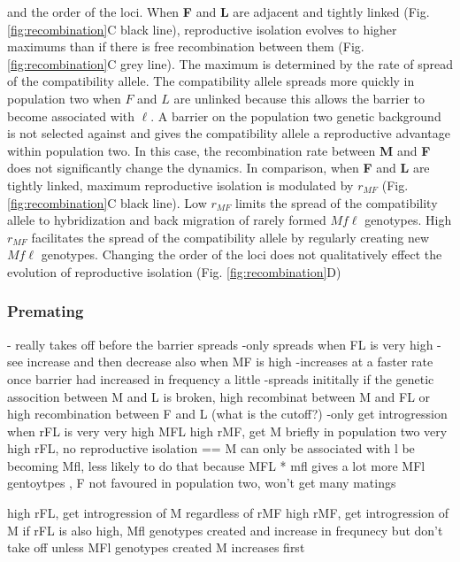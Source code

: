 \documentclass[11pt]{article}
\begin{document}
and the order of the loci. When \textbf{F} and \textbf{L} are adjacent and tightly linked (Fig. \ref{fig:recombination}C black line), reproductive isolation evolves to higher maximums than if there is free recombination between them (Fig. \ref{fig:recombination}C grey line). The maximum is determined by the rate of spread of the compatibility allele. The compatibility allele spreads more quickly in population two when $F$ and $L$ are unlinked because this allows the barrier to become associated with $\ell$. A barrier on the population two genetic background is not selected against and gives the compatibility allele a reproductive advantage within population two. In this case, the recombination rate between \textbf{M} and \textbf{F} does not significantly change the dynamics. In comparison, when \textbf{F} and \textbf{L} are tightly linked, maximum reproductive isolation is modulated by $r_{MF}$ (Fig. \ref{fig:recombination}C black line). Low $r_{MF}$ limits the spread of the compatibility allele to hybridization and back migration of rarely formed $Mf\ell$ genotypes. High $r_{MF}$ facilitates the spread of the compatibility allele by regularly creating new $Mf\ell$ genotypes. Changing the order of the loci does not qualitatively effect the evolution of reproductive isolation (Fig. \ref{fig:recombination}D)



\subsubsection*{Premating}

- really takes off before the barrier spreads
-only spreads when FL is very high
- see increase and then decrease also when MF is high 
-increases at a faster rate once barrier had increased in frequency a little
-spreads inititally if the genetic assocition between M and L is broken, high recombinat between M and FL or high recombination between F and L (what is the cutoff?)
-only get introgression when rFL is very very high
MFL 
high rMF, get M briefly in population two
very high rFL, no reproductive isolation == M can only be associated with l be becoming Mfl, less likely to do that because MFL * mfl gives a lot more MFl gentoytpes , F not favoured in population two, won't get many matings

high rFL, get introgression of M regardless of rMF
high rMF, get introgression of M if rFL is also high, Mfl genotypes created and increase in frequnecy but don't take off unless MFl genotypes created
M increases first
\end{document}
